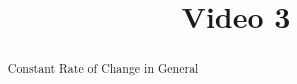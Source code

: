 \documentclass[handout]{ximera}
\title{Video 3}
\begin{document}
\begin{abstract}
Constant Rate of Change in General
\end{abstract}

\maketitle

\end{document}
